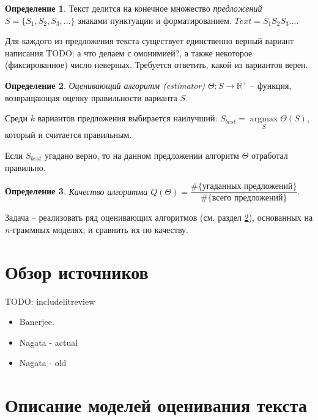 \documentclass[14pt,russian]{extreport}
\DeclareMathOperator*{\argmax}{argmax}
\newcommand*{\argmaxl}{\argmax\limits}
\theoremstyle{definition}
\newtheorem{definition}{Определение}[subsection]
\newcommand{\todo}[1]{}
\renewcommand{\todo}[1]{{\color{red} TODO: {#1}}}
\begin{document}
\begin{definition}
	Текст делится на конечное множество {\textit{предложений $S = \{ S_1, S_2, S_3, ... \}$}} знаками пунктуации и форматированием. $Text = S_1S_2S_3...$.
\end{definition}

Для каждого из предложения текста существует единственно верный вариант написания \todo{а что делаем с омонимией?}, а также некоторое (фиксированное) число неверных. Требуется ответить, какой из вариантов верен.

\begin{definition}
	{\textit{Оценивающий алгоритм (estimator) $\Theta : S \rightarrow \mathbb{R}^+ $}} -- функция, возвращающая оценку правильности варианта $S$.
\end{definition}

Среди $k$ вариантов предложения выбирается наилучший: $S_{best} = \argmaxl_{S} \Theta(S)$, который и считается правильным.

Если $S_{best}$ угадано верно, то на данном предложении алгоритм $\Theta$ отработал правильно.

\begin{definition}
	{\textit{Качество алгоритма $Q(\Theta) = \dfrac{\#\{ \text{угаданных предложений} \}}{\#\{ \text{всего предложений} \}}$}}.
\end{definition}

Задача -- реализовать ряд оценивающих алгоритмов (см. раздел \ref{sec:models}), основанных на $n$-граммных моделях, и сравнить их по качеству.

\newpage
\section{ Обзор источников }\label{sec:litreview}

\todo{include{litreview}}

\begin{itemize}
	\item Banerjee. 

	\item Nagata - actual

	\item Nagata - old
\end{itemize}

\newpage
\section{ Описание моделей оценивания текста }\label{sec:models}
\end{document}
